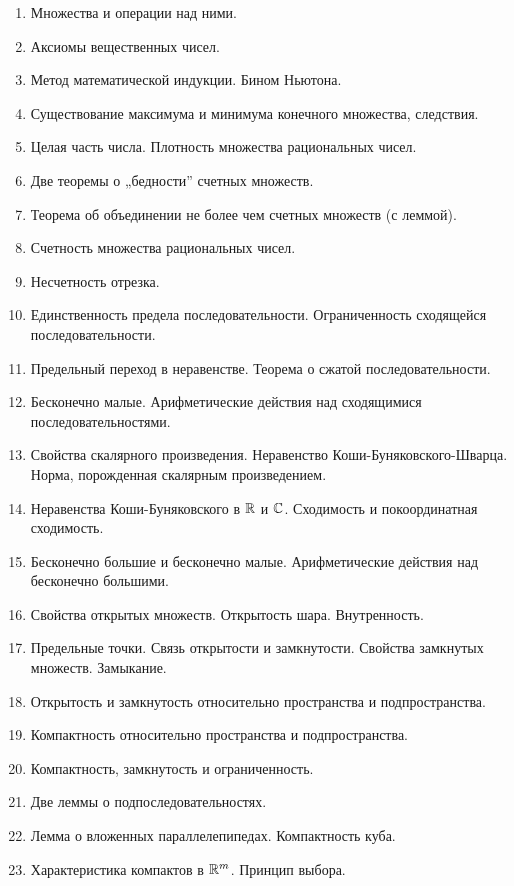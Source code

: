 \documentclass[12pt, a4paper]{article}
\begin{document}
\begin{enumerate}
    \item Множества и операции над ними.
    \item Аксиомы вещественных чисел.
    \item Метод математической индукции. Бином Ньютона.
    \item Существование максимума и минимума конечного множества, следствия.
    \item Целая часть числа. Плотность множества рациональных чисел.
    \item Две теоремы о „бедности” счетных множеств.
    \item Теорема об объединении не более чем счетных множеств (с леммой).
    \item Счетность множества рациональных чисел.
    \item Несчетность отрезка.
    \item Единственность предела последовательности. Ограниченность сходящейся последовательности.
    \item Предельный переход в неравенстве. Теорема о сжатой последовательности.
    \item Бесконечно малые. Арифметические действия над сходящимися последовательностями.
    \item Свойства скалярного произведения. Неравенство Коши-Буняковского-Шварца. Норма, порожденная скалярным произведением.
    \item Неравенства Коши-Буняковского в ${\mathbb{R}}$ и ${\mathbb{C}}$. Сходимость и покоординатная сходимость.
    \item Бесконечно большие и бесконечно малые. Арифметические действия над бесконечно большими.
    \item Свойства открытых множеств. Открытость шара. Внутренность.
    \item Предельные точки. Связь открытости и замкнутости. Свойства замкнутых множеств. Замыкание.
    \item Открытость и замкнутость относительно пространства и подпространства.
    \item Компактность относительно пространства и подпространства.
    \item Компактность, замкнутость и ограниченность.
    \item Две леммы о подпоследовательностях.
    \item Лемма о вложенных параллелепипедах. Компактность куба.
    \item Характеристика компактов в ${\mathbb{R}}^m$. Принцип выбора.

\end{enumerate}
\end{document}
